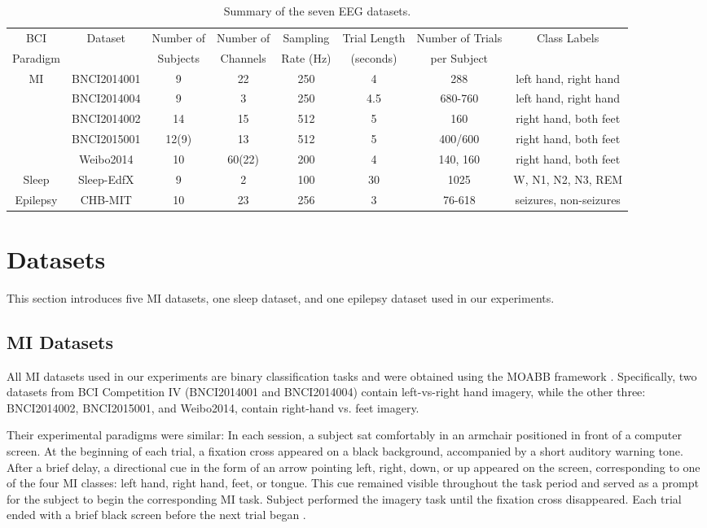 \documentclass[journal,twocolumn]{IEEEtran}
\begin{document}
\begin{table}[htpb] \centering
  \caption{Summary of the seven EEG datasets.}
  \label{tab:datasets}
  \begin{tabular}{c|c|c|c|c|c|c|c}
  \toprule
  BCI&\multirow{2}{*}{Dataset} & Number of & Number of & Sampling & Trial Length & Number of Trials  & \multirow{2}{*}{Class Labels} \\
  Paradigm& & Subjects & Channels & Rate (Hz) & (seconds) & per Subject &  \\
  \midrule
  \multirow{4}{*}{MI}&BNCI2014001 & 9 & 22 & 250 & 4  & 288 &  left hand, right hand \\
  &BNCI2014004 & 9 & 3 & 250 & 4.5 & 680-760 &  left hand, right hand \\
  &BNCI2014002 & 14 & 15 & 512 & 5 & 160 &  right hand, both feet \\
  &BNCI2015001 & 12(9) & 13 & 512 & 5 & 400/600 &  right hand, both feet \\
  &Weibo2014 & 10 & 60(22) & 200 & 4 & 140, 160 &  right hand, both feet \\
  \midrule
  Sleep&Sleep-EdfX& 9 & 2 & 100 & 30 & 1025 &  W, N1, N2, N3, REM \\
  \midrule
  Epilepsy&CHB-MIT&10&23&256&3&76-618&seizures, non-seizures \\
  \bottomrule
  \end{tabular}
\end{table}

  
\section{Datasets}
This section introduces five MI datasets, one sleep dataset, and one epilepsy dataset used in our experiments.
\subsection{MI Datasets}
All MI datasets used in our experiments are binary classification tasks and were obtained using the MOABB framework \cite{jayaram2018moabb}. Specifically, two datasets from BCI Competition IV (BNCI2014001 and BNCI2014004) \cite{tangermann2012review} contain left-vs-right hand imagery, while the other three: BNCI2014002, BNCI2015001, and Weibo2014, contain right-hand vs. feet imagery. 

Their experimental paradigms were similar: In each session, a subject sat comfortably in an armchair positioned in front of a computer screen. At the beginning of each trial, a fixation cross appeared on a black background, accompanied by a short auditory warning tone. After a brief delay, a directional cue in the form of an arrow pointing left, right, down, or up appeared on the screen, corresponding to one of the four MI classes: left hand, right hand, feet, or tongue. This cue remained visible throughout the task period and served as a prompt for the subject to begin the corresponding MI task. Subject performed the imagery task until the fixation cross disappeared. Each trial ended with a brief black screen before the next trial began \cite{tangermann2012review}.
\end{document}
